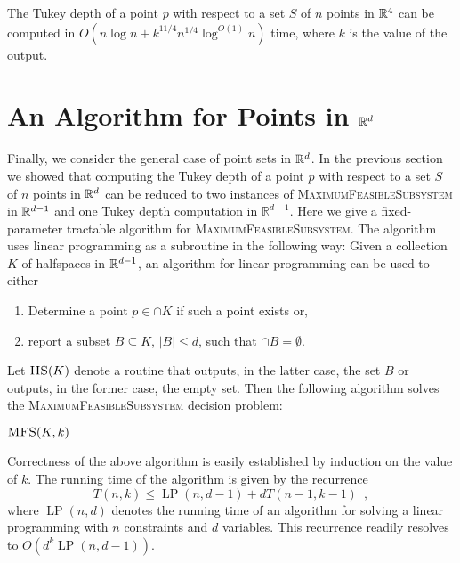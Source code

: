 \documentclass[charterfonts,lotsofwhite]{patmorin}
\DeclareMathOperator{\lp}{LP}
\begin{document}
\begin{thm}
The Tukey depth of a point $p$ with respect to a set $S$ of $n$ points
in $\mathbb{R}^4$ can be computed in $O(n\log n + k^{11/4}n^{1/4}\log^{O(1)}
n)$ time, where $k$ is the value of the output.
\end{thm}

\section{An Algorithm for Points in $\mathbb{R}^d$}

Finally, we consider the general case of point sets in $\mathbb{R}^d$.  
In the previous section we showed that computing the Tukey depth of
a point $p$ with respect to a set $S$ of $n$ points in $\mathbb{R}^d$
can be reduced to two instances of \textsc{MaximumFeasibleSubsystem}
in $\mathbb{R}^{d-1}$ and one Tukey depth computation in $\mathbb{R}^{d-1}$.  Here we give a fixed-parameter tractable \cite{df98}
algorithm for \textsc{MaximumFeasibleSubsystem}.  The algorithm uses
linear programming as a subroutine in the following way:  Given a
collection $K$ of halfspaces in $\mathbb{R}^{d-1}$, an algorithm for linear
programming can be used to either
\begin{enumerate}
\item Determine a point $p\in\cap K$ if such a point exists or,
\item report a subset $B\subseteq K$, $|B|\le d$, such that $\cap B=\emptyset$.
\end{enumerate}
Let $\textsc{IIS}(K)$ denote a routine that outputs, in the latter
case, the set
$B$ or outputs, in the former case, the empty set.
Then the following algorithm solves the
\textsc{MaximumFeasibleSubsystem} decision problem:

\noindent$\textsc{MFS}(K,k)$
\begin{algorithmic}[1]
\ENDIF
{}
\ENDIF
{}
   \ENDIF
\ENDFOR
{}
\end{algorithmic}

Correctness of the above algorithm is easily established by induction
on the value of $k$.  The running time of the algorithm is given by
the recurrence
\[
    T(n,k) \le \lp(n,d-1)+ dT(n-1,k-1) \enspace ,
\]
where $\lp(n,d)$ denotes the running time of an algorithm for solving
a linear programming with $n$ constraints and $d$ variables.  This
recurrence readily resolves to $O(d^k\lp(n,d-1))$.  
\end{document}
